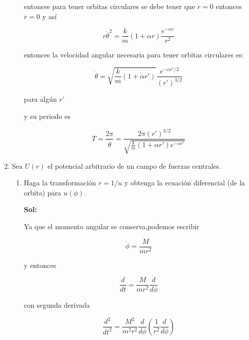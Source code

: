 \documentclass[12pt,a4paper]{article}
\begin{document}
\begin{enumerate}
\begin{enumerate}
    entonces para tener orbitas circulares se debe tener que $\dot{r}=0$ entonces $\ddot{r} =0$ y así
    
    \begin{equation*}
        r \dot{\theta}^2 = \frac{k}{m} (1 + \alpha r) \frac{e^{-\alpha r}}{r^2}
    \end{equation*}
    
    entonces la velocidad angular necesaria para tener orbitas circulares es:
    
    \begin{equation*}
        \dot{\theta} = \sqrt{\frac{k}{m}(1+\alpha r')} \frac{e^{-\alpha r'/2}}{(r')^{3/2}}
    \end{equation*}
    
    para algún $r'$
    
    y su periodo es
    
    \begin{equation*}
        T = \frac{2\pi}{\dot{\theta}} = \frac{2\pi (r')^{3/2}}{\sqrt{\frac{k}{m}(1 + \alpha r') e^{-\alpha r'}}}
    \end{equation*}
    
\end{enumerate}






\item Sea $U(r)$ el potencial arbitrario de un campo de fuerzas centrales.

\begin{enumerate}
    \item Haga la transformación $r=1/u$ y obtenga la ecuación diferencial (de la orbita) para $u(\phi)$.
    
    \textbf{Sol:}
    
    Ya que el momento angular se conserva,podemos escribir
    
    \begin{equation*}
        \dot{\phi} =  \frac{M}{mr^2}
    \end{equation*}
    
    y entonces
    
    \begin{equation*}
    \frac{d}{dt} = \frac{M}{mr^2} \frac{d}{d \phi}
    \end{equation*}
    
    con segunda derivada
    
    \begin{equation*}
        \frac{d^2}{dt^2} = \frac{M^2}{m^2 r^2} \frac{d}{d\phi} \left(\frac{1}{r^2}\frac{d}{d\phi}\right)
    \end{equation*}
    

\end{enumerate}
\end{enumerate}
\end{document}
